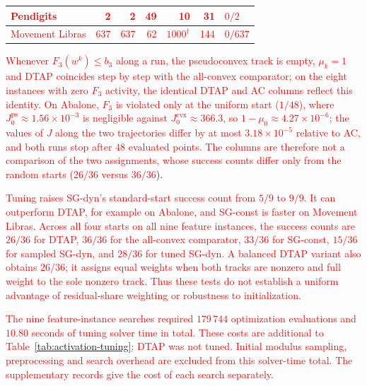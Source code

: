 \documentclass[]{interact}
\theoremstyle{plain}
\theoremstyle{definition}
\theoremstyle{remark}
\newcommand{\cvx}{\mathrm{cvx}}
\newcommand{\ps}{\mathrm{ps}}
\begin{document}
\begin{table}[t]
\begin{tabular}{@{}lrrrrrl@{}}
\leavevmode\textcolor{red}{Pendigits}    & \leavevmode\textcolor{red}{2} & \leavevmode\textcolor{red}{2} & \leavevmode\textcolor{red}{49} & \leavevmode\textcolor{red}{10} & \leavevmode\textcolor{red}{31} & \leavevmode\textcolor{red}{$0/2$}\\
\midrule
\leavevmode\textcolor{red}{Movement Libras} & \leavevmode\textcolor{red}{637} & \leavevmode\textcolor{red}{637} & \leavevmode\textcolor{red}{62} & \leavevmode\textcolor{red}{$1000^\dagger$} & \leavevmode\textcolor{red}{144} & \leavevmode\textcolor{red}{$0/637$}\\
\bottomrule
\end{tabular}
\end{table}

\leavevmode\textcolor{red}{Whenever $F_3(w^k)\le b_3$ along a run, the pseudoconvex track is empty,
$\mu_k=1$ and DTAP coincides step by step with the all-convex comparator;
on the eight instances with zero $F_3$ activity, the identical DTAP and AC
columns reflect this identity. On Abalone, $F_3$ is violated only at the uniform
start ($1/48$), where $J^{\ps}_0\approx1.56\times10^{-3}$ is negligible against
$J^{\cvx}_0\approx366.3$, so $1-\mu_0\approx4.27\times10^{-6}$; the values of $J$
along the two trajectories differ by at most $3.18\times10^{-5}$ relative to AC,
and both runs stop after $48$ evaluated points. The columns
are therefore not a comparison of the two assignments, whose success counts
differ only from the random starts ($26/36$ versus $36/36$}).

\leavevmode\textcolor{red}{Tuning raises SG-dyn's standard-start success count from $5/9$ to $9/9$.
It can outperform DTAP, for example on Abalone, and SG-const is faster
on Movement Libras. Across all four starts on all nine feature instances,
the success counts are $26/36$ for DTAP, $36/36$ for the all-convex
comparator, $33/36$ for SG-const, $15/36$ for sampled SG-dyn, and $28/36$
for tuned SG-dyn. A balanced DTAP variant also obtains $26/36$; it assigns
equal weights when both tracks are nonzero and full weight to the sole
nonzero track. Thus these tests do not establish a uniform advantage of
residual-share weighting or robustness to initialization.}

\leavevmode\textcolor{red}{The nine feature-instance searches required $179\,744$ optimization
evaluations and $10.80$ seconds of tuning solver time in total. These costs
are additional to Table~\ref{tab:activation-tuning}; DTAP was not tuned.
Initial modulus sampling, preprocessing and search overhead are excluded
from this solver-time total. The supplementary records give the cost of
each search separately.}
\end{document}
